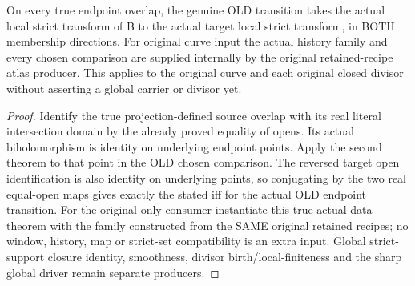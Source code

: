 \begin{theorem}
\label{hir:sharp-actual-endpoint-transition-strict-set-membership}
\leanok
{}
On every true endpoint overlap, the genuine OLD transition takes the actual
local strict transform of B to the actual target local strict transform,
in BOTH membership directions. For original curve input the actual history
family and every chosen comparison are supplied internally by the original
retained-recipe atlas producer. This applies to the original curve and each
original closed divisor without asserting a global carrier or divisor yet.
\end{theorem}
\begin{proof}
Identify the true projection-defined source overlap with its real literal
intersection domain by the already proved equality of opens. Its actual
biholomorphism is identity on underlying endpoint points. Apply the second
theorem to that point in the OLD chosen comparison. The reversed target
open identification is also identity on underlying points, so conjugating
by the two real equal-open maps gives exactly the stated iff for the actual
OLD endpoint transition. For the original-only consumer instantiate this
true actual-data theorem with the family constructed from the SAME original
retained recipes; no window, history, map or strict-set compatibility is an
extra input. Global strict-support closure identity, smoothness, divisor
birth/local-finiteness and the sharp global driver remain separate producers.
\end{proof}
